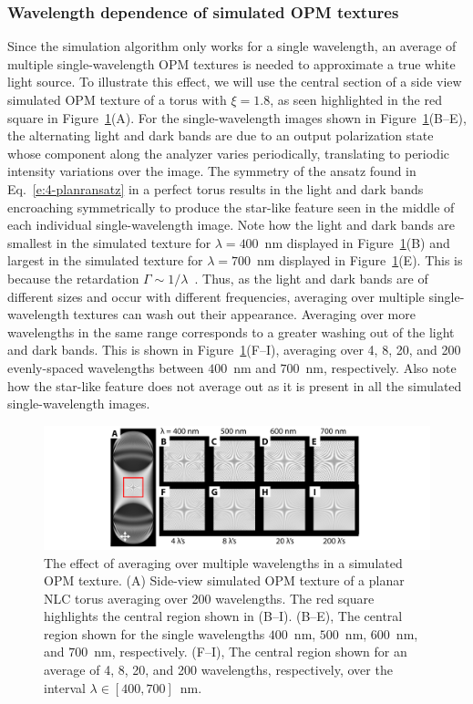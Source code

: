 \subsubsection{Wavelength dependence of simulated OPM textures}
Since the simulation algorithm only works for a single wavelength, an average of multiple single-wavelength OPM textures is needed to approximate a true white light source.
To illustrate this effect, we will use the central section of a side view simulated OPM texture of a torus with $\xi = 1.8$, as seen highlighted in the red square in Figure~\ref{fig_lambda}(A).
For the single-wavelength images shown in Figure~\ref{fig_lambda}(B--E), the alternating light and dark bands are due to an output polarization state whose component along the analyzer varies periodically, translating to periodic intensity variations over the image.
The symmetry of the ansatz found in Eq.~\ref{e:4-planransatz} in a perfect torus results in the light and dark bands encroaching symmetrically to produce the star-like feature seen in the middle of each individual single-wavelength image.
Note how the light and dark bands are smallest in the simulated texture for $\lambda = 400 $~nm displayed in Figure~\ref{fig_lambda}(B) and largest in the simulated texture for $\lambda = 700$~nm displayed in Figure~\ref{fig_lambda}(E).
This is because the retardation $\Gamma \sim 1/\lambda$~\cite{RN232}.
Thus, as the light and dark bands are of different sizes and occur with different frequencies, averaging over multiple single-wavelength textures can wash out their appearance.
Averaging over more wavelengths in the same range corresponds to a greater washing out of the light and dark bands.
This is shown in Figure~\ref{fig_lambda}(F--I), averaging over 4, 8, 20, and 200 evenly-spaced wavelengths between $400$~nm and $700$~nm, respectively.
Also note how the star-like feature does not average out as it is present in all the simulated single-wavelength images.
\begin{figure}
\centering
\includegraphics{figures/C4/Ch4-Figs_SimWavelengthAverage.png}
\caption{The effect of averaging over multiple wavelengths in a simulated OPM texture.
(A) Side-view simulated OPM texture of a planar NLC torus averaging over 200 wavelengths.
The red square highlights the central region shown in (B--I).
(B--E), The central region shown for the single wavelengths $400$~nm, $500$~nm, $600$~nm, and $700$~nm, respectively.
(F--I), The central region shown for an average of 4, 8, 20, and 200 wavelengths, respectively, over the interval $\lambda \in [400,700]$~nm.}\label{fig_lambda}
\end{figure}


